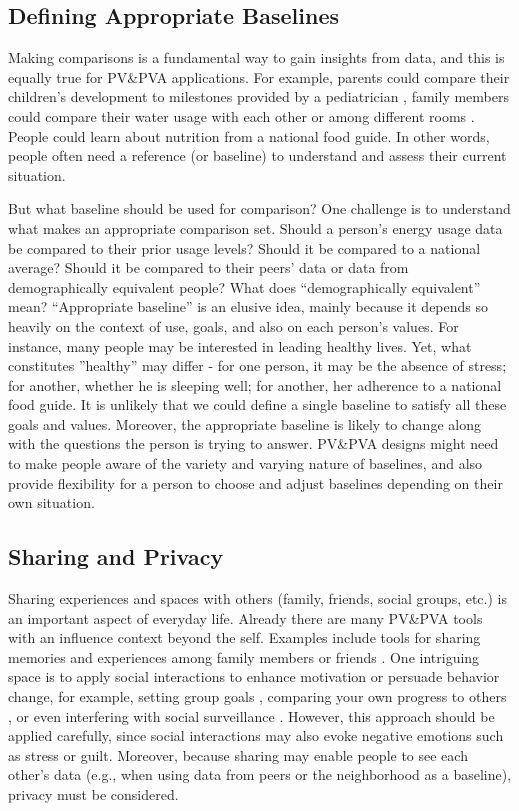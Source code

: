 \documentclass[12pt,oneside]{book}
\begin{document}
\subsection{Defining Appropriate Baselines}
\label{pva:baselines}
Making comparisons is a fundamental way to gain insights from data, and this is equally true for PV\&PVA applications.  For example, parents could compare their children's development to milestones provided by a pediatrician \cite{kientz_baby_2009}, family members could compare their water usage with each other or among different rooms \cite{froehlich_design_2012}. People could learn about nutrition from a national food guide. In other words, people often need a reference (or baseline) to understand and assess their current situation.

But what baseline should be used for comparison?  One challenge is to understand what makes an appropriate comparison set. Should a person's energy usage data be compared to their prior usage levels?  Should it be compared to a national average?  Should it be compared to their peers' data or data from demographically equivalent people? What does ``demographically equivalent'' mean?  ``Appropriate baseline'' is an elusive idea, mainly because it depends so heavily on the context of use, goals, and also on each person's values. For instance, many people may be interested in leading healthy lives.  Yet, what constitutes ''healthy'' may differ - for one person, it may be the absence of stress; for another, whether he is sleeping well; for another, her adherence to a national food guide.  It is unlikely that we could define a single baseline to satisfy all these goals and values. Moreover, the appropriate baseline is likely to change along with the questions the person is trying to answer.  PV\&PVA designs might need to make people aware of the variety and varying nature of baselines, and also provide flexibility for a person to choose and adjust baselines depending on their own situation.

\subsection{Sharing and Privacy}
Sharing experiences and spaces with others (family, friends, social groups, etc.) is an important aspect of everyday life.  Already there are many PV\&PVA tools with an influence context beyond the self.  Examples include tools for sharing memories and experiences among family members or friends \cite{pousman_living_2008,thiry_authoring_2013}.  One intriguing space is to apply social interactions to enhance motivation or persuade behavior change, for example, setting group goals \cite{lin_fishnsteps:_2006}, comparing your own progress to others \cite{chiu_playful_2009}, or even interfering with social surveillance \cite{thieme_weve_2012}. However, this approach should be applied carefully, since social interactions may also evoke negative emotions such as stress or guilt. Moreover, because sharing may enable people to see each other's data (e.g., when using data from peers or the neighborhood as a baseline), privacy must be considered.
\end{document}
